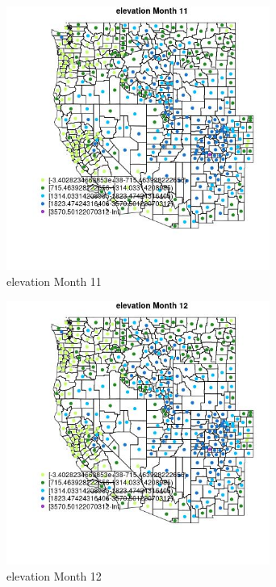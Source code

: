 \begin{figure} 
\centering  
\includegraphics[width=0.77\textwidth]{Code_Outputs/df_report_ML_predictors_CountyCentroid_Locations_Dates_2008-01-01to2018-12-31_MapObsMo11elevation.jpg} 
\caption{\label{fig:df_report_ML_predictors_CountyCentroid_Locations_Dates_2008-01-01to2018-12-31MapObsMo11elevation}elevation Month 11} 
\end{figure} 
 

\begin{figure} 
\centering  
\includegraphics[width=0.77\textwidth]{Code_Outputs/df_report_ML_predictors_CountyCentroid_Locations_Dates_2008-01-01to2018-12-31_MapObsMo12elevation.jpg} 
\caption{\label{fig:df_report_ML_predictors_CountyCentroid_Locations_Dates_2008-01-01to2018-12-31MapObsMo12elevation}elevation Month 12} 
\end{figure} 
 

